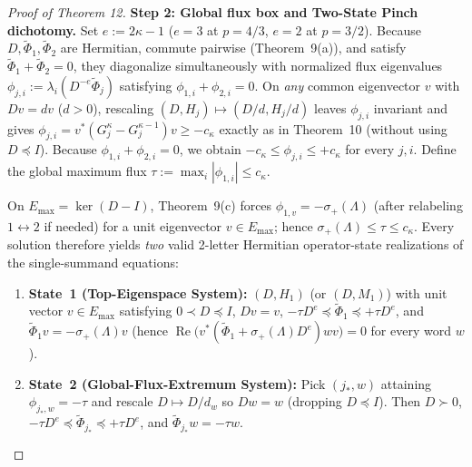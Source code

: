 \documentclass[10pt,letterpaper]{article}
\begin{document}
\begin{proof}[Proof of Theorem 12]
\textbf{Step 2: Global flux box and Two-State Pinch dichotomy.}
Set $e := 2\kappa - 1$ ($e = 3$ at $p = 4/3$, $e = 2$ at $p = 3/2$). Because $D, \widetilde{\Phi}_1, \widetilde{\Phi}_2$ are Hermitian, commute pairwise (Theorem~9(a)), and satisfy $\widetilde{\Phi}_1 + \widetilde{\Phi}_2 = 0$, they diagonalize simultaneously with normalized flux eigenvalues $\phi_{j,i} := \lambda_i(D^{-e}\widetilde{\Phi}_j)$ satisfying $\phi_{1,i} + \phi_{2,i} = 0$. On \emph{any} common eigenvector $v$ with $Dv = dv$ ($d > 0$), rescaling $(D, H_j) \mapsto (D/d, H_j/d)$ leaves $\phi_{j,i}$ invariant and gives $\phi_{j,i} = v^*(G_j^\kappa - G_j^{\kappa-1})v \ge -c_\kappa$ exactly as in Theorem~10 (without using $D \preceq I$). Because $\phi_{1,i} + \phi_{2,i} = 0$, we obtain $-c_\kappa \le \phi_{j,i} \le +c_\kappa$ for every $j, i$. Define the global maximum flux $\tau := \max_i |\phi_{1,i}| \le c_\kappa$.

On $E_{\max} = \ker(D - I)$, Theorem~9(c) forces $\phi_{1,v} = -\sigma_+(\Lambda)$ (after relabeling $1 \leftrightarrow 2$ if needed) for a unit eigenvector $v \in E_{\max}$; hence $\sigma_+(\Lambda) \le \tau \le c_\kappa$. Every solution therefore yields \emph{two} valid 2-letter Hermitian operator-state realizations of the single-summand equations:
\begin{enumerate}[leftmargin=1.6em,itemsep=1.5pt]
  \item \textbf{State~1 (Top-Eigenspace System):} $(D, H_1)$ (or $(D, M_1)$) with unit vector $v \in E_{\max}$ satisfying $0 \prec D \preceq I$, $Dv = v$, $-\tau D^e \preceq \widetilde{\Phi}_1 \preceq +\tau D^e$, and $\widetilde{\Phi}_1 v = -\sigma_+(\Lambda) v$ (hence $\operatorname{Re}\bigl(v^*(\widetilde{\Phi}_1 + \sigma_+(\Lambda) D^e) w v\bigr) = 0$ for every word $w$).
  \item \textbf{State~2 (Global-Flux-Extremum System):} Pick $(j_*, w)$ attaining $\phi_{j_*, w} = -\tau$ and rescale $D \mapsto D/d_w$ so $Dw = w$ (dropping $D \preceq I$). Then $D \succ 0$, $-\tau D^e \preceq \widetilde{\Phi}_{j_*} \preceq +\tau D^e$, and $\widetilde{\Phi}_{j_*} w = -\tau w$.
\end{enumerate}


\end{proof}
\end{document}
